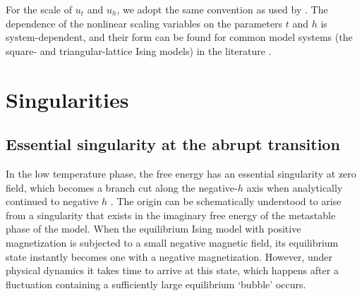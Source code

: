 \documentclass[
aps,
pre,
preprint,
longbibliography,
floatfix
]{revtex4-2}
\begin{document}
For the scale of $u_t$ and $u_h$, we adopt the same convention as used by
\cite{Fonseca_2003_Ising}. The dependence of the nonlinear scaling variables on
the parameters $t$ and $h$ is system-dependent, and their form can be found for
common model systems (the square- and triangular-lattice Ising models) in the
literature \cite{Mangazeev_2010_Scaling, Clement_2019_Respect}.

\section{Singularities}

\subsection{Essential singularity at the abrupt transition}

In the low temperature phase, the free energy has an essential singularity at
zero field, which becomes a branch cut along the negative-$h$ axis when
analytically continued to negative $h$ \cite{Langer_1967_Theory}. The origin
can be schematically understood to arise from a singularity that exists in the
imaginary free energy of the metastable phase of the model. When the
equilibrium Ising model with positive magnetization is subjected to a small
negative magnetic field, its equilibrium state instantly becomes one with a
negative magnetization. However, under physical dynamics it takes time to
arrive at this state, which happens after a fluctuation containing a
sufficiently large equilibrium `bubble' occurs.
\end{document}
